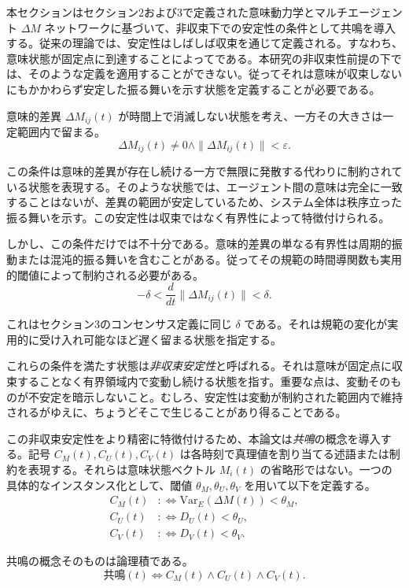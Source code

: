 \documentclass[11pt,a4paper]{article}
\theoremstyle{definition}
\begin{document}
本セクションはセクション2および3で定義された意味動力学とマルチエージェント $\Delta M$ ネットワークに基づいて、非収束下での安定性の条件として共鳴を導入する。従来の理論では、安定性はしばしば収束を通じて定義される。すなわち、意味状態が固定点に到達することによってである。本研究の非収束性前提の下では、そのような定義を適用することができない。従ってそれは意味が収束しないにもかかわらず安定した振る舞いを示す状態を定義することが必要である。

意味的差異 $\Delta M_{ij}(t)$ が時間上で消滅しない状態を考え、一方その大きさは一定範囲内で留まる。
\[
\Delta M_{ij}(t) \neq 0 \land \|\Delta M_{ij}(t)\| < \varepsilon.
\]

この条件は意味的差異が存在し続ける一方で無限に発散する代わりに制約されている状態を表現する。そのような状態では、エージェント間の意味は完全に一致することはないが、差異の範囲が安定しているため、システム全体は秩序立った振る舞いを示す。この安定性は収束ではなく有界性によって特徴付けられる。

しかし、この条件だけでは不十分である。意味的差異の単なる有界性は周期的振動または混沌的振る舞いを含むことがある。従ってその規範の時間導関数も実用的閾値によって制約される必要がある。
\[
-\delta < \frac{d}{dt}\|\Delta M_{ij}(t)\| < \delta.
\]

これはセクション3のコンセンサス定義に同じ $\delta$ である。それは規範の変化が実用的に受け入れ可能なほど遅く留まる状態を指定する。

これらの条件を満たす状態は\textit{非収束安定性}と呼ばれる。それは意味が固定点に収束することなく有界領域内で変動し続ける状態を指す。重要な点は、変動そのものが不安定を暗示しないこと。むしろ、安定性は変動が制約された範囲内で維持されるがゆえに、ちょうどそこで生じることがあり得ることである。

この非収束安定性をより精密に特徴付けるため、本論文は\textit{共鳴}の概念を導入する。記号 $C_M(t), C_U(t), C_V(t)$ は各時刻で真理値を割り当てる述語または制約を表現する。それらは意味状態ベクトル $M_i(t)$ の省略形ではない。一つの具体的なインスタンス化として、閾値 $\theta_M, \theta_U, \theta_V$ を用いて以下を定義する。
\begin{align}
C_M(t) &: \Leftrightarrow \text{Var}_E(\Delta M(t)) < \theta_M, \\
C_U(t) &: \Leftrightarrow D_U(t) < \theta_U, \\
C_V(t) &: \Leftrightarrow D_V(t) < \theta_V.
\end{align}

共鳴の概念そのものは論理積である。
\[
\text{共鳴}(t) \Leftrightarrow C_M(t) \land C_U(t) \land C_V(t).
\]
\end{document}
